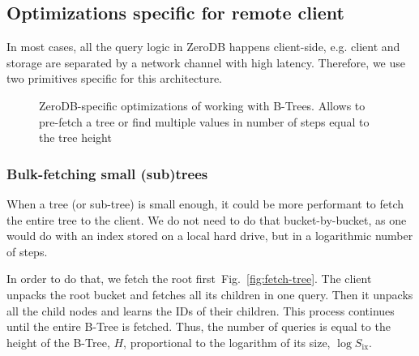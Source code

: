 \documentclass[notitlepage]{revtex4-1}
\newcommand{\figref}[1]{Fig.~\ref{#1}}
\begin{document}
\subsection{Optimizations specific for remote client}

In most cases, all the query logic in ZeroDB happens client-side, e.g. client and storage are separated by a network channel with high latency.
Therefore, we use two primitives specific for this architecture.

\begin{figure}
	\begin{center}
        \qquad
	\end{center}
    \caption{ZeroDB-specific optimizations of working with B-Trees. Allows to pre-fetch a tree or find multiple values in number of steps equal to the tree height}
	\label{fig:tree-traversal-optimizations}
\end{figure}

\subsubsection{Bulk-fetching small (sub)trees}
\label{sec:bulk-fetching}

When a tree (or sub-tree) is small enough, it could be more performant to fetch the entire tree to the client.
We do not need to do that bucket-by-bucket, as one would do with an index stored on a local hard drive, but in a logarithmic number of steps.

In order to do that, we fetch the root first~\figref{fig:fetch-tree}.
The client unpacks the root bucket and fetches all its children in one query.
Then it unpacks all the child nodes and learns the IDs of their children.
This process continues until the entire B-Tree is fetched.
Thus, the number of queries is equal to the height of the B-Tree, $H$, proportional to the logarithm of its size, $\log{S_{\mbox{ix}}}$.
\end{document}
